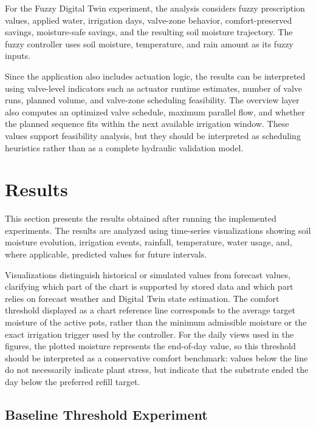 \par For the Fuzzy Digital Twin experiment, the analysis considers fuzzy prescription
    values, applied water, irrigation days, valve-zone behavior, comfort-preserved
    savings, moisture-safe savings, and the resulting soil moisture trajectory. The fuzzy
    controller uses soil moisture, temperature, and rain amount as its fuzzy inputs.

\par Since the application also includes actuation logic, the results can be interpreted
    using valve-level indicators such as actuator runtime estimates, number of valve runs,
    planned volume, and valve-zone scheduling feasibility. The overview layer also
    computes an optimized valve schedule, maximum parallel flow, and whether the planned
    sequence fits within the next available irrigation window. These values support
    feasibility analysis, but they should be interpreted as scheduling heuristics rather
    than as a complete hydraulic validation model.

\section{Results}
\label{sec:ch4sec4}

\par This section presents the results obtained after running the implemented experiments.
    The results are analyzed using time-series visualizations showing soil moisture
    evolution, irrigation events, rainfall, temperature, water usage, and, where
    applicable, predicted values for future intervals.

\par Visualizations distinguish historical or simulated values from forecast values,
    clarifying which part of the chart is supported by stored data and which part relies
    on forecast weather and Digital Twin state estimation. The comfort threshold displayed
    as a chart reference line corresponds to the average target moisture of the active
    pots, rather than the minimum admissible moisture or the exact irrigation trigger used
    by the controller. For the daily views used in the figures, the plotted moisture
    represents the end-of-day value, so this threshold should be interpreted as a
    conservative comfort benchmark: values below the line do not necessarily indicate
    plant stress, but indicate that the substrate ended the day below the preferred refill
    target.

\subsection{Baseline Threshold Experiment}
\label{baseline_results}

